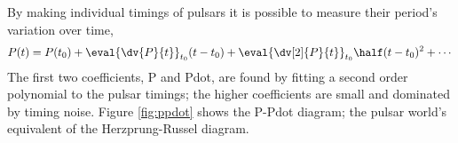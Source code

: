 By making individual timings of pulsars it is possible to measure
their period's variation over time,
\begin{equation}
  \label{eq:114}
  P(t) = P(t_0) + \eval{\dv{P}{t}}_{t_0} (t-t_0) + \eval{ \dv[2]{P}{t}}_{t_0} \half (t-t_0)^2 + \cdots
\end{equation}
The first two coefficients, P and Pdot, are found by fitting a second
order polynomial to the pulsar timings; the higher coefficients are
small and dominated by timing noise. Figure \ref{fig:ppdot} shows the
P-Pdot diagram; the pulsar world's equivalent of the Herzprung-Russel
diagram.


